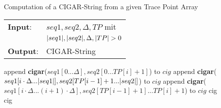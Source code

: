 \begin{algorithm}
\caption{Computation of a CIGAR-String from a given Trace Point Array}
\label{decode}
\noindent\begin{tabular}{@{}l@{~}l}
	\textbf{Input}:
	&$seq1, seq2, \Delta, TP$ mit\\
	&$|seq1|, |seq2|, \Delta, |TP| > 0$\\
	\textbf{Output}:&CIGAR-String
\end{tabular}
\medskip
	\begin{algorithmic}[1]
		\State {}
				\State append \textbf{cigar}($seq1[0...\Delta], seq2[0...TP[i] + 1]$) to $cig$
				\State append \textbf{cigar}($seq1[i \cdot \Delta...|seq1|], seq2[TP[i - 1] + 1...|seq2|]$) to $cig$
			\Else
				\State append \textbf{cigar}($seq1[i \cdot \Delta...(i + 1) \cdot \Delta], seq2[TP[i - 1] + 1]...TP[i] + 1$) to $cig$ %
			\EndIf
		\EndFor
		\State {}
		\State \Return cig
		\EndFunction\\
		
		\State {}
		\State {}
			\State {}
				\State {}
				\EndIf
			\EndIf
				\State {}
			\EndIf
		\EndFor
		\State \Return cig
		\EndFunction
	\end{algorithmic}
\end{algorithm}